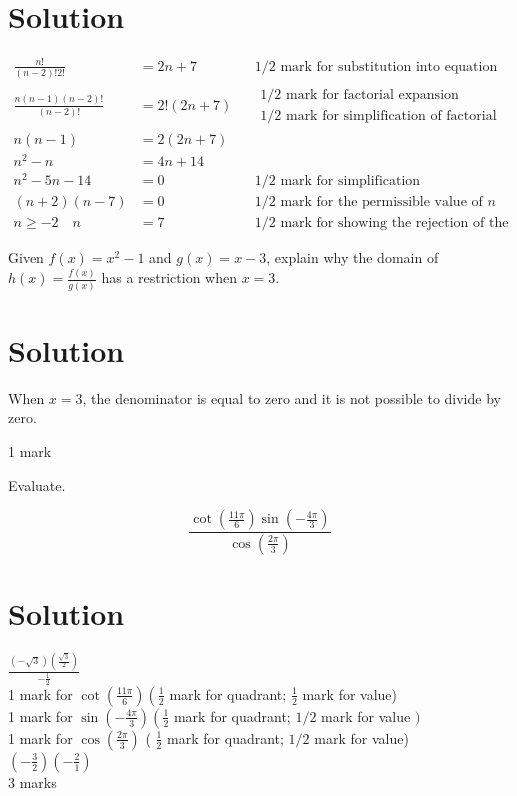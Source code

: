 \documentclass[10pt]{article}
\begin{document}
\section*{Solution}
$$
\begin{aligned}
\frac{n!}{(n-2)!2!} & =2 n+7 & & 1 / 2 \text { mark for substitution into equation } \\
\frac{n(n-1)(n-2)!}{(n-2)!} & =2!(2 n+7) & & \begin{array}{l}
1 / 2 \text { mark for factorial expansion } \\
1 / 2 \text { mark for simplification of factorial }
\end{array} \\
n(n-1) & =2(2 n+7) & & \\
n^{2}-n & =4 n+14 & & \\
n^{2}-5 n-14 & =0 & & 1 / 2 \text { mark for simplification } \\
(n+2)(n-7) & =0 & & 1 / 2 \text { mark for the permissible value of } n \\
n \geq-2 \quad n & =7 & & 1 / 2 \text { mark for showing the rejection of the extraneous root }
\end{aligned}
$$

Given $f(x)=x^{2}-1$ and $g(x)=x-3$, explain why the domain of $h(x)=\frac{f(x)}{g(x)}$ has a restriction when $x=3$.

\section*{Solution}
When $x=3$, the denominator is equal to zero and it is not possible to divide by zero.

1 mark

Evaluate.

$$
\frac{\cot \left(\frac{11 \pi}{6}\right) \sin \left(-\frac{4 \pi}{3}\right)}{\cos \left(\frac{2 \pi}{3}\right)}
$$

\section*{Solution}
$\frac{(-\sqrt{3})\left(\frac{\sqrt{3}}{2}\right)}{-\frac{1}{2}}$\\
1 mark for $\cot \left(\frac{11 \pi}{6}\right)\left(\frac{1}{2}\right.$ mark for quadrant; $\frac{1}{2}$ mark for value)\\
1 mark for $\sin \left(-\frac{4 \pi}{3}\right)\left(\frac{1}{2}\right.$ mark for quadrant; $1 / 2$ mark for value $)$\\
1 mark for $\cos \left(\frac{2 \pi}{3}\right)$ ( $\frac{1}{2}$ mark for quadrant; $1 / 2$ mark for value)\\
$\left(-\frac{3}{2}\right)\left(-\frac{2}{1}\right)$\\
3 marks
\end{document}
